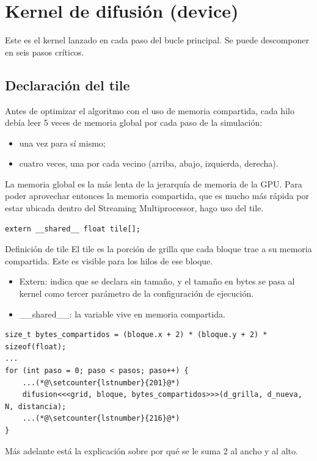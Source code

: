 \section{Kernel de difusión (device)}
Este es el kernel lanzado en cada paso del bucle principal. Se puede descomponer en seis pasos críticos.
\subsection{Declaración del tile} 
Antes de optimizar el algoritmo con el uso de memoria compartida, cada hilo debía leer 5 veces de memoria global por cada paso de la simulación:
    \begin{itemize}
        \item una vez para sí mismo;
        \item cuatro veces, una por cada vecino (arriba, abajo, izquierda, derecha).
    \end{itemize}
    La memoria global es la más lenta de la jerarquía de memoria de la GPU. Para poder aprovechar entonces la memoria compartida, que es mucho más rápida por estar ubicada dentro del Streaming Multiprocessor, hago uso del tile.
\begin{lstlisting}[firstnumber=106]
extern __shared__ float tile[];
\end{lstlisting}
\begin{block}{Definición de tile}
El tile es la porción de grilla que cada bloque trae a su memoria compartida. Este es visible para los hilos de ese bloque. 
\end{block}
    \begin{itemize}
        \item Extern: indica que se declara sin tamaño, y el tamaño en bytes se pasa al kernel como tercer parámetro de la configuración de ejecución.
        \item \_\_shared\_\_: la variable vive en memoria compartida.
    \end{itemize}
\begin{lstlisting}[firstnumber=194]
size_t bytes_compartidos = (bloque.x + 2) * (bloque.y + 2) * sizeof(float);
...
for (int paso = 0; paso < pasos; paso++) {
    ...(*@\setcounter{lstnumber}{201}@*)
    difusion<<<grid, bloque, bytes_compartidos>>>(d_grilla, d_nueva, N, distancia);
    ...(*@\setcounter{lstnumber}{216}@*)
}
\end{lstlisting}

    Más adelante está la explicación sobre por qué se le suma 2 al ancho y al alto.

